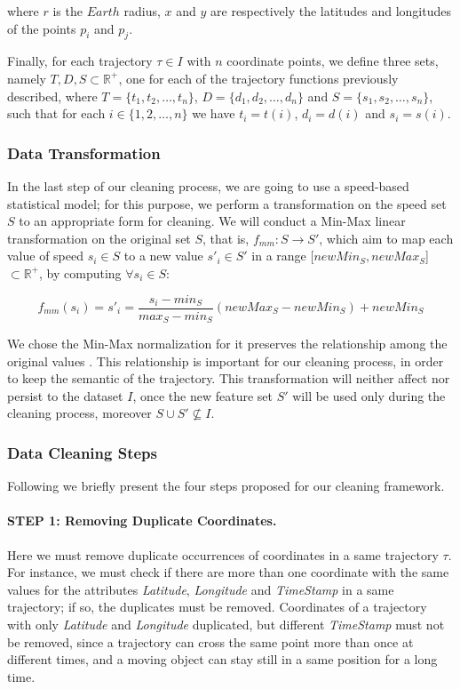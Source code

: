 \documentclass[a4paper,12pt]{article}
\begin{document}
where $r$ is the $Earth$ radius, $x$ and $y$ are respectively the latitudes and longitudes of the points $p_i$ and $p_j$. 

Finally, for each trajectory $\tau \in I$ with $n$ coordinate points, we define three sets, namely $T, D, S \subset \mathbb{R^+}$, one for each of the trajectory functions previously described, where $T = \{t_1, t_2, \dots, t_n\}$, $D = \{d_1, d_2, \dots, d_n\}$ and $S = \{s_1, s_2, \dots, s_n\}$, such that for each $i \in \{1, 2, \dots, n\}$ we have $t_i = t(i)$, $d_i = d(i)$ and $s_i = s(i)$.

\subsubsection{Data Transformation}\label{sec:transformation}
In the last step of our cleaning process, we are going to use a speed-based statistical model; for this purpose, we perform a transformation on the speed set $S$ to an appropriate form for cleaning. We will conduct a Min-Max linear transformation on the original set $S$, that is, $f_{mm} : S \rightarrow S'$, which aim to map each value of speed $s_i \in S$ to a new value $s'_i \in S'$ in a range [$newMin_S, newMax_S$] $\subset\mathbb{R^+}$, by computing $\forall s_i \in S$: 

\[ f_{mm}(s_i) = s'_i = \frac{s_i - min_S}{max_S - min_S}(newMax_S - newMin_S) + newMin_S \]

We chose the Min-Max normalization for it preserves the relationship among the original values \cite{han2011}. This relationship is important for our cleaning process, in order to keep the semantic of the trajectory. This transformation will neither affect nor persist to the dataset $I$, once the new feature set $S'$ will be used only during the cleaning process, moreover $S \cup S' \nsubseteq I$. 

\subsubsection{Data Cleaning Steps}\label{sec:cleaningsteps}
Following we briefly present the four steps proposed for our cleaning framework.

\paragraph{STEP 1: Removing Duplicate Coordinates.}
Here we must remove duplicate occurrences of coordinates in a same trajectory $\tau$. For instance, we must check if there are more than one coordinate with the same values for the attributes \textit{Latitude}, \textit{Longitude} and \textit{TimeStamp} in a same trajectory; if so, the duplicates must be removed. Coordinates of a trajectory with only \textit{Latitude} and \textit{Longitude} duplicated, but different \textit{TimeStamp} must not be removed, since a trajectory can cross the same point more than once at different times, and a moving object can stay still in a same position for a long time.
\end{document}

